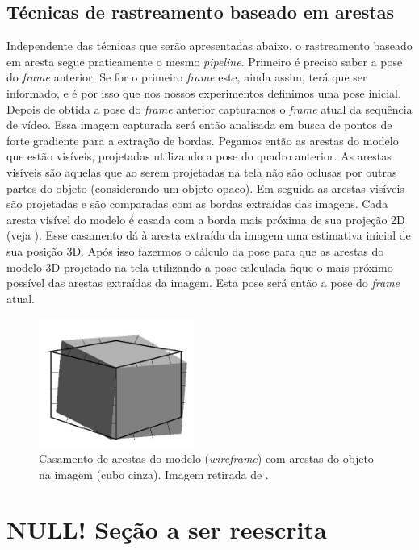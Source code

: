 \subsection{Técnicas de rastreamento baseado em arestas}

Independente das técnicas que serão apresentadas abaixo, o rastreamento baseado em aresta segue praticamente o mesmo \emph{pipeline}. Primeiro é preciso saber a pose do \emph{frame} anterior. Se for o primeiro \emph{frame} este, ainda assim, terá que ser informado, e é por isso que nos nossos experimentos definimos uma pose inicial. Depois de obtida a pose do \emph{frame} anterior capturamos o \emph{frame} atual da sequência de vídeo. Essa imagem capturada será então analisada em busca de pontos de forte gradiente para a extração de bordas. Pegamos então as arestas do modelo que estão visíveis, projetadas utilizando a pose do quadro anterior. As arestas visíveis são aquelas que ao serem projetadas na tela não são oclusas por outras partes do objeto (considerando um objeto opaco). Em seguida as arestas visíveis são projetadas e são comparadas com as bordas extraídas das imagens. Cada aresta visível do modelo é casada com a borda mais próxima de sua projeção 2D (veja ). Esse casamento dá à aresta extraída da imagem uma estimativa inicial de sua posição 3D. Após isso fazermos o cálculo da pose para que as arestas do modelo 3D projetado na tela utilizando a pose calculada fique o mais próximo possível das arestas extraídas da imagem. Esta pose será então a pose do \emph{frame} atual.

\begin{figure}[!ht]
\centering\includegraphics[width=2in]{monografia/cubo_pipeline_drummond}
\caption{Casamento de arestas do modelo (\emph{wireframe}) com arestas do objeto na imagem (cubo cinza). Imagem retirada de \cite{drummondecipolla}.}
\label{cubo_pipeline_drummond}
\end{figure}

\section{NULL! Seção a ser reescrita}

